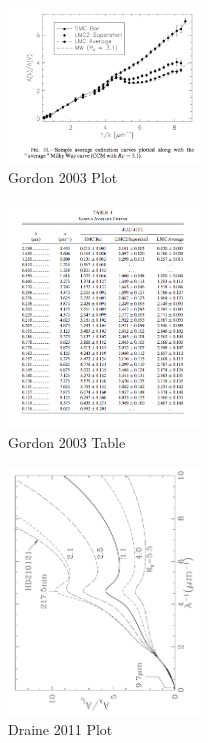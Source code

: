 \documentclass[12pt,letterpaper]{article}
\begin{document}
\begin{figure}[htbp] %
   \centering
   \includegraphics[width=2in]{Gordon_2003_Fig.png} 
   \caption{Gordon 2003 Plot}
   \label{fig:Gordonplot}
\end{figure}
\begin{figure}[htbp] %
   \centering
   \includegraphics[width=2in]{Gordon_2003_Tab.png} 
   \caption{Gordon 2003 Table}
   \label{fig:Gordonplot}
\end{figure}
\begin{figure}[htbp] %
   \centering
   \includegraphics[width=2in]{Reddening_Draine_fig_21_2.pdf} 
   \caption{Draine 2011 Plot}
   \label{fig:Gordonplot}
\end{figure}
\end{document}
